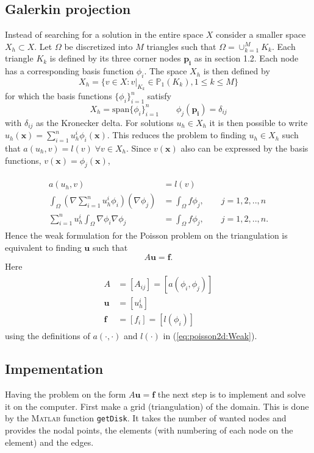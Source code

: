 \documentclass[paper=a4, fontsize=11pt]{scrartcl} %
\begin{document}
\subsection{Galerkin projection}
Instead of searching for a solution in the entire space $X$ consider a smaller space $X_h \subset X$. Let $\Omega$ be discretized into $M$ triangles such that $\Omega = \cup^M_{k=1} K_k$. Each triangle $K_k$ is defined by its three corner nodes $\mathbf{p_i}$ as in section 1.2. Each node has a corresponding basis function $\phi_i$. The space $X_h$ is then defined by
\[ X_h = \{v \in X : v|_{K_k} \in \mathbb{P}_1(K_k),1\leq k\leq M\}\] 
for which the basis functions $\{\phi_i\}^n_{i=1}$ satisfy
\[ X_h = \mathrm{span}\{\phi_i\}^n_{i=1} \qquad \phi_j(\mathbf{p_i})=\delta_{ij}\]
with $\delta_{ij}$ as the Kronecker delta. For solutions $u_h\in X_h$ it is then possible to write $u_h(\mathbf{x})=\sum^n_{i=1} u^i_h\phi_i(\mathbf{x})$. This reduces the problem to finding $u_h \in X_h$ such that $a(u_h,v)=l(v) \; \forall v\in X_h$.
Since $v(\mathbf{x})$ also can be expressed by the basis functions, $v(\mathbf{x})=\phi_j(\mathbf{x})$,

\begin{eqnarray}
\begin{aligned}
\nonumber
a(u_h,v) &= l(v) \\
\int_{\Omega}(\nabla\sum\limits_{i=1}^n u^i_h\phi_i)(\nabla\phi_j) &= \int_{\Omega}\! f \phi_j, \qquad j=1,2,..,n \\
\sum\limits_{i=1}^n u^i_h\int_{\Omega}\nabla\phi_i \nabla\phi_j &= \int_{\Omega}\! f \phi_j, \qquad j=1,2,..,n.
\end{aligned}
\end{eqnarray}
Hence the weak formulation for the Poisson problem on the triangulation is equivalent to finding $\mathbf{u}$ such that
\[A\mathbf{u}=\mathbf{f}.\]  
Here
\begin{eqnarray}
\begin{aligned}
\nonumber
A &= [A_{ij}]=[a(\phi_i,\phi_j)]\\
\mathbf{u} &= [u_{h}^i] \\
\mathbf{f} &= [f_i]=[l(\phi_i)]
\end{aligned}
\end{eqnarray}
using the definitions of $a(\cdot,\cdot)$ and $l(\cdot)$ in (\ref{eq:poisson2d:Weak}).

\subsection{Impementation}
Having the problem on the form $A\mathbf{u}=\mathbf{f}$ the next step is to implement and solve it on the computer. First make a grid (triangulation) of the domain. This is done by the \textsc{Matlab} function \texttt{getDisk}. It takes the number of wanted nodes and provides the nodal points, the elements (with numbering of each node on the element) and the edges.
\end{document}
